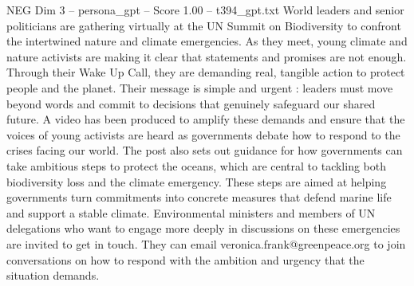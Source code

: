 \begin{textsample}{NEG Dim 3 – persona\_gpt – Score 1.00 – t394\_gpt.txt}  \label{ex:f3_neg_040}
World leaders and senior politicians are gathering virtually at the UN Summit on Biodiversity to confront the intertwined nature and climate emergencies.
As they meet, young climate and nature activists are making it clear that statements and promises are not enough.
Through their Wake Up Call, they are demanding real, tangible action to protect people and the planet.
Their message is simple and urgent : leaders must move beyond words and commit to decisions that genuinely safeguard our shared future.
A video has been produced to amplify these demands and ensure that the voices of young activists are heard as governments debate how to respond to the crises facing our world.
The post also sets out guidance for how governments can take ambitious steps to protect the oceans, which are central to tackling both biodiversity loss and the climate emergency.
These steps are aimed at helping governments turn commitments into concrete measures that defend marine life and support a stable climate.
Environmental ministers and members of UN delegations who want to engage more deeply in discussions on these emergencies are invited to get in touch.
They can email veronica.frank@greenpeace.org to join conversations on how to respond with the ambition and urgency that the situation demands.

\end{textsample}
